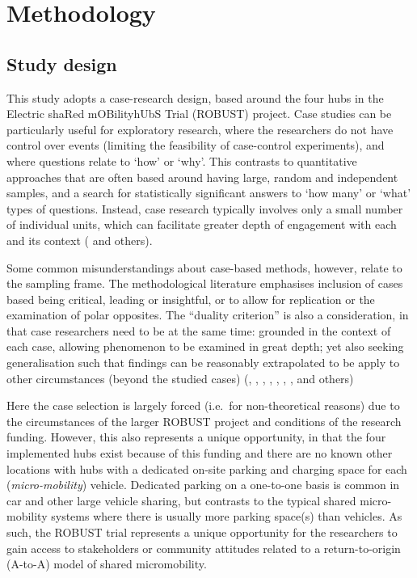 \documentclass[preprint, 3p,
authoryear]{elsarticle} %
\begin{document}
\section{Methodology}\label{methodology}

\subsection{Study design}\label{study-design}

This study adopts a case-research design, based around the four hubs in
the Electric shaRed mOBilityhUbS Trial (ROBUST) project. Case studies
can be particularly useful for exploratory research, where the
researchers do not have control over events (limiting the feasibility of
case-control experiments), and where questions relate to `how' or `why'.
This contrasts to quantitative approaches that are often based around
having large, random and independent samples, and a search for
statistically significant answers to `how many' or `what' types of
questions. Instead, case research typically involves only a small number
of individual units, which can facilitate greater depth of engagement
with each and its context (\citet{Yin:2018ab} and others).

Some common misunderstandings about case-based methods, however, relate
to the sampling frame. The methodological literature emphasises
inclusion of cases based being critical, leading or insightful, or to
allow for replication or the examination of polar opposites. The
``duality criterion'' is also a consideration, in that case researchers
need to be at the same time: grounded in the context of each case,
allowing phenomenon to be examined in great depth; yet also seeking
generalisation such that findings can be reasonably extrapolated to be
apply to other circumstances (beyond the studied cases)
(\citet{Benbasat:1987aa}, \citet{Bonoma:1984aa}, \citet{Darke:1998aa},
\citet{Meredith:1998aa}, \citet{Stuart:2002aa},
\citet{Denscombe:2007aa}, \citet{Ketokivi:2014aa}, \citet{Yin:2018ab}
and others)

Here the case selection is largely forced (i.e.~for non-theoretical
reasons) due to the circumstances of the larger ROBUST project and
conditions of the research funding. However, this also represents a
unique opportunity, in that the four implemented hubs exist because of
this funding and there are no known other locations with hubs with a
dedicated on-site parking and charging space for each
(\emph{micro-mobility}) vehicle. Dedicated parking on a one-to-one basis
is common in car and other large vehicle sharing, but contrasts to the
typical shared micro-mobility systems where there is usually more
parking space(s) than vehicles. As such, the ROBUST trial represents a
unique opportunity for the researchers to gain access to stakeholders or
community attitudes related to a return-to-origin (A-to-A) model of
shared micromobility.
\end{document}
